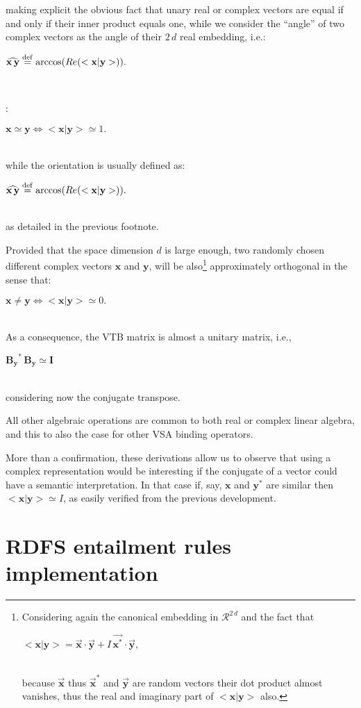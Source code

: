 \documentclass[sn-mathphys]{sn-jnl}
\newcommand{\defq}{\stackrel {\rm def}{=}}
\newcommand{\eqline}[1]{~\vspace{0.1cm}\\\centerline{$#1$}\vspace{0.1cm}\\}
\begin{document}
\begin{appendices}
{making explicit the obvious fact that unary real or complex vectors are equal if and only if their inner product equals one, while we consider the ``angle'' of two complex vectors as the angle of their $2\,d$ real embedding, i.e.:
\eqline{\widehat{\mathbf{x} \, \mathbf{y}} \defq \mbox{arccos}(Re(<\mathbf{x} \vert \mathbf{y}>)).}}: 
\eqline{\mathbf{x} \simeq \mathbf{y} \Leftrightarrow <\mathbf{x} \vert \mathbf{y}> \simeq 1.
} while the orientation is usually defined as:
\eqline{\widehat{\mathbf{x} \, \mathbf{y}} \defq \mbox{arccos}(Re(<\mathbf{x} \vert \mathbf{y}>)).}
as detailed in the previous footnote.

Provided that the space dimension $d$ is large enough, two randomly chosen different complex vectors $\mathbf{x}$ and $\mathbf{y}$, will be also\footnote{
Considering again the canonical embedding in ${\mathcal R}^{2\,d}$ and the fact that
\eqline{<\mathbf{x} \vert \mathbf{y}> = \overrightarrow{\mathbf{x}} \cdot \overrightarrow{\mathbf{y}} + I \, 
  \overrightarrow{\mathbf{x}^*} \cdot \overrightarrow{\mathbf{y}},}
because $\overrightarrow{\mathbf{x}}$ thus $\overrightarrow{\mathbf{x}}^*$ and $\overrightarrow{\mathbf{y}}$ are random vectors their dot product almost vanishes, thus the real and imaginary part of $<\mathbf{x} \vert \mathbf{y}>$ also.} approximately orthogonal in the sense that:
\eqline{\mathbf{x} \neq \mathbf{y} \Leftrightarrow <\mathbf{x} \vert \mathbf{y}> \simeq 0.}
As a consequence, the VTB matrix is almost a unitary matrix, i.e., 
\eqline{\mathbf{B_y}^* \, \mathbf{B_y} \simeq \mathbf{I}}
considering now the conjugate transpose.

All other algebraic operations are common to both real or complex linear algebra, and this to also the case for other VSA binding operators.

More than a confirmation, these derivations allow us to observe that using a complex representation would be interesting if the conjugate of a vector could have a semantic interpretation. In that case if, say, $\mathbf{x}$ and $\mathbf{y}^*$ are similar then $<\mathbf{x} \vert \mathbf{y}> \simeq I$, as easily verified from the previous development. 

\section{RDFS entailment rules implementation} \label{RDFS-entailment-rules}


\end{appendices}
\end{document}
